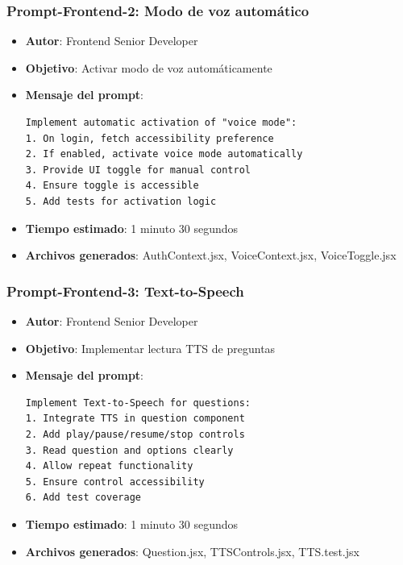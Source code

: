 \documentclass[12pt]{article}
\begin{document}
\subsubsection{Prompt-Frontend-2: Modo de voz automático}
\begin{itemize}
    \item \textbf{Autor}: Frontend Senior Developer
    \item \textbf{Objetivo}: Activar modo de voz automáticamente
    \item \textbf{Mensaje del prompt}:
    \begin{verbatim}
Implement automatic activation of "voice mode":
1. On login, fetch accessibility preference
2. If enabled, activate voice mode automatically
3. Provide UI toggle for manual control
4. Ensure toggle is accessible
5. Add tests for activation logic
    \end{verbatim}
    \item \textbf{Tiempo estimado}: 1 minuto 30 segundos
    \item \textbf{Archivos generados}: AuthContext.jsx, VoiceContext.jsx, VoiceToggle.jsx
\end{itemize}

\subsubsection{Prompt-Frontend-3: Text-to-Speech}
\begin{itemize}
    \item \textbf{Autor}: Frontend Senior Developer
    \item \textbf{Objetivo}: Implementar lectura TTS de preguntas
    \item \textbf{Mensaje del prompt}:
    \begin{verbatim}
Implement Text-to-Speech for questions:
1. Integrate TTS in question component
2. Add play/pause/resume/stop controls
3. Read question and options clearly
4. Allow repeat functionality
5. Ensure control accessibility
6. Add test coverage
    \end{verbatim}
    \item \textbf{Tiempo estimado}: 1 minuto 30 segundos
    \item \textbf{Archivos generados}: Question.jsx, TTSControls.jsx, TTS.test.jsx
\end{itemize}
\end{document}
